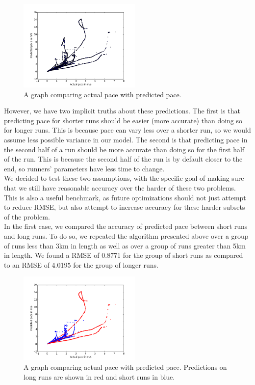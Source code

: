 \documentclass[twoside]{article}
\begin{document}
\begin{multicols}{2}
\begin{figure}[H]
\begin{center}
\includegraphics[width=6cm]{all.png}
\caption{A graph comparing actual pace with predicted pace. }
\end{center}
\end{figure}

However, we have two implicit truths about these predictions. The first is that predicting pace for shorter runs should be easier (more accurate) than doing so for longer runs. This is because pace can vary less over a shorter run, so we would assume less possible variance in our model. The second is that predicting pace in the second half of a run should be more accurate than doing so for the first half of the run. This is because the second half of the run is by default closer to the end, so runners' parameters have less time to change. \\

We decided to test these two assumptions, with the specific goal of making sure that we still have reasonable accuracy over the harder of these two problems. This is also a useful benchmark, as future optimizations should not just attempt to reduce RMSE, but also attempt to increase accuracy for these harder subsets of the problem.\\
 
In the first case, we compared the accuracy of predicted pace between short runs and long runs. To do so, we repeated the algorithm presented above over a group of runs less than 3km in length as well as over a group of runs greater than 5km in length. We found a RMSE of 0.8771  for the group of short runs as compared to an RMSE of 4.0195 for the group of longer runs.

\begin{figure}[H]
\begin{center}
\includegraphics[width=6cm]{longshort.png}
\caption{A graph comparing actual pace with predicted pace. Predictions on long runs are shown in red and short runs in blue. }
\end{center}
\end{figure}


\end{multicols}
\end{document}
